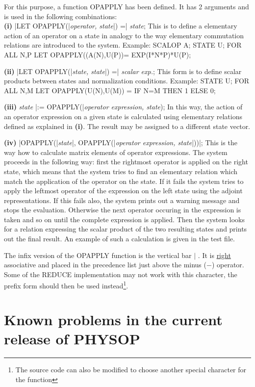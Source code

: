 For this purpose, a function OPAPPLY  has been defined.
It has 2 arguments and is used in the following combinations: \\

{\bf (i)}  |LET OPAPPLY(|{\it operator, state}|) =| {\it state};
This is to define a elementary
action of an operator on a state in analogy to the way
elementary commutation relations are introduced to the system.
Example:
\begintt
SCALOP A; STATE U;
FOR ALL N,P LET OPAPPLY((A(N),U(P))= EXP(I*N*P)*U(P);
\endtt

{\bf (ii)} |LET OPAPPLY(|{\it state, state}|) =| {\it scalar exp.};
This form is to define scalar products between states and normalization
conditions.
Example:
\begintt
STATE U;
FOR ALL N,M LET OPAPPLY(U(N),U(M)) = IF N=M THEN 1 ELSE 0;
\endtt

{\bf (iii)} {\it state} |:= OPAPPLY(|{\it operator expression, state});
 In this way, the action of an operator expression on a given state
is calculated using elementary relations defined as explained in {\bf
(i)}. The result may be assigned to a different state vector.

{\bf (iv)} |OPAPPLY(|{\it state}|, OPAPPLY(|{\it operator expression,
state}|))|; This is the way how to calculate matrix elements of
operator
expressions. The system proceeds in the following way: first the
rightmost operator is applied on the right state, which means that the
system tries
to find an elementary relation which match the application of the
operator on the state. If it fails
the system tries to apply the leftmost operator of the expression on the
left state using the adjoint representations. If this fails also,
the system prints out a warning message and stops the evaluation.
Otherwise the next operator occuring in the expression is
taken and so on until the complete expression is applied.  Then the
system
looks for a relation expressing the scalar product of the two
resulting states and prints out the final result. An example of such
a calculation is given in the test file.

The infix version of the OPAPPLY function is the vertical bar $\mid$ .
It is \underline{right} associative and placed in the precedence
list just above the minus ($-$) operator.
Some of the REDUCE implementation may not work with this character,
the prefix form should then be used instead\footnote{The source code
can also be modified to choose another special character for the
function}.

\section{Known problems in the current release of PHYSOP}

